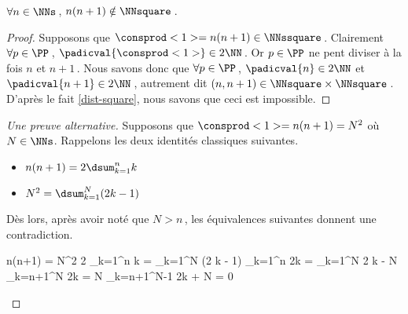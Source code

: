 \begin{fact} \label{case-1}
	 $\forall n \in \NNs$\,, $n(n+1) \notin \NNsquare$\,.
\end{fact}




\begin{proof}
    Supposons que $\consprod<1> = n(n+1) \in \NNssquare$\,.
    Clairement $\forall p \in \PP$\,, $\padicval{\consprod<1>} \in 2 \NN$\,.
    Or $p \in \PP$ ne pent diviser à la fois $n$ et $n+1$\,.
    Nous savons donc que $\forall p \in \PP$\,, 
    $\padicval{n} \in 2 \NN$ et $\padicval{n+1} \in 2 \NN$\,,
    autrement dit 
    $(n, n + 1) \in \NNsquare \times \NNsquare$\,.
    D'après le fait \ref{dist-square}, nous savons que ceci est impossible.
\end{proof}




\begin{proof}[Une preuve alternative]
     Supposons que $\consprod<1> = n(n+1) = N^2$ où $N \in \NNs$.
     Rappelons les deux identités classiques suivantes.
     \begin{itemize}
     	\item $n(n+1) = 2 \dsum_{k=1}^{n} k$

     	\item $N^2 = \dsum_{k=1}^{N} (2 k - 1)$
     \end{itemize}
     Dès lors, après avoir noté que $N > n$\,, les équivalences suivantes donnent une contradiction.
	
	\medskip
	
	\begin{stepcalc}[style = sar, ope = \iff]
		n(n+1) = N^2
	\explnext{}
		2 \dsum_{k=1}^{n} k = \dsum_{k=1}^{N} (2 k - 1)
	\explnext{}
		\dsum_{k=1}^{n} 2k = \dsum_{k=1}^{N} 2 k - N
	\explnext{}
		\dsum_{k=n+1}^{N} 2k = N
		\dsum_{k=n+1}^{N-1} 2k + N = 0
	\end{stepcalc}

	\vspace{-2ex}	
	\leavevmode
\end{proof}
